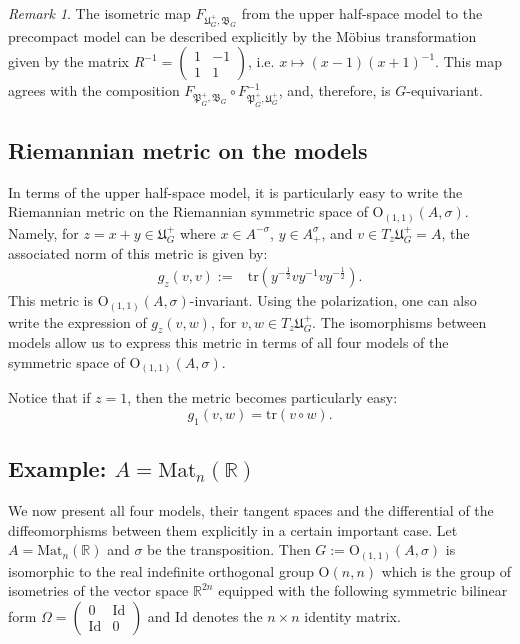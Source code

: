 \documentclass[oneside,11pt]{amsart}
\theoremstyle{definition}
\theoremstyle{remark}
\newtheorem{rem}[thm]{Remark}
\numberwithin{thm}{section}
\numberwithin{equation}{section}
\begin{document}
\begin{rem}
    The isometric map $F_{\mathfrak{U}_G^+,\mathfrak{B}_G}$ from the upper half-space model to the precompact model can be described explicitly by the M\"obius transformation given by the matrix $R^{-1}=\begin{pmatrix}
        1 & -1 \\
        1 & 1
    \end{pmatrix}$, i.e. $x\mapsto (x-1)(x+1)^{-1}$. This map agrees with the composition $F_{\mathfrak{P}_G^+,\mathfrak{B}_G}\circ F_{\mathfrak{P}_G^+,\mathfrak{U}_G^+}^{-1}$, and, therefore, is $G$-equivariant.
\end{rem}

\subsection{Riemannian metric on the models}

In terms of the upper half-space model, it is particularly easy to write the Riemannian metric on the Riemannian symmetric space of $\mathrm{O}_{(1,1)}(A,\sigma)$. Namely, for $z=x+y\in \mathfrak U^+_G$ where $x\in A^{-\sigma}$, $y\in A^\sigma_+$, and $v\in T_z\mathfrak U^+_G=A$, the associated norm of this metric is given by:
\begin{align*}
    g_z(v,v):=&\mathrm{tr}\left(y^{-\frac{1}{2}} vy^{-1}vy^{-\frac{1}{2}}\right).    
\end{align*}
This metric is $\mathrm{O}_{(1,1)}(A,\sigma)$-invariant. Using the polarization, one can also write the expression of $g_z(v,w)$, for $v,w\in T_z\mathfrak U^+_G$. The isomorphisms between models allow us to express this metric in terms of all four models of the symmetric space of $\mathrm{O}_{(1,1)}(A,\sigma)$.

Notice that if $z=1$, then the metric becomes particularly easy: 
$$g_1(v,w)=\mathrm{tr}(v\circ w).$$



\subsection{Example: \texorpdfstring{$A=\mathrm{Mat}_n(\mathbb R)$}{}}\label{sec:exam_A_real_mat_ortog}
    We now present all four models, their tangent spaces and the differential of the diffeomorphisms between them explicitly in a certain important case. Let $A=\mathrm{Mat}_n(\mathbb R)$ and $\sigma$ be the transposition. Then $G:=\mathrm{O}_{(1,1)}(A,\sigma)$ is isomorphic to the real indefinite orthogonal group $\mathrm{O}(n,n)$ which is the group of isometries of the vector space $\mathbb R^{2n}$ equipped with the following symmetric bilinear form  $\Omega=\begin{pmatrix} 0 & \mathrm{Id} \\ \mathrm{Id} & 0 \end{pmatrix}$ and $\mathrm{Id}$ denotes the $n\times n$ identity matrix.
\end{document}
